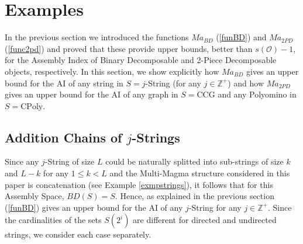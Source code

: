 \documentclass[letterpaper,12pt]{article}
\theoremstyle{definition}
\begin{document}





\section{Examples}\label{secExa}
In the previous section we introduced the functions $Ma_{BD}$ (\ref{funBD}) and $Ma_{2PD}$ (\ref{func2pd}) and proved that these provide upper bounds, better than $s(\mathscr{O})-1$, for the Assembly Index of Binary Decomposable and 2-Piece Decomposable objects, respectively. In this section, we show explicitly how $Ma_{BD}$ gives an upper bound for the AI of any string in $S=j$-String (for any $j \in \mathbb{Z}^+$) and how $Ma_{2PD}$ gives an upper bound for the AI of any graph in $S=\text{CCG}$ and any Polyomino in $S=\text{CPoly}$.             

\subsection{Addition Chains of $j$-Strings}
Since any $j$-String of size $L$ could be naturally splitted into sub-strings of size $k$ and $L-k$ for any $1 \leq k<L$ and the Multi-Magma structure considered in this paper is concatenation (see Example \ref{exmpstrings}), it follows that for this Assembly Space, $BD(S)=S$.  Hence, as explained in the previous section (\ref{funBD}) gives an upper bound for the AI of any $j$-String for any $j \in \mathbb{Z}^+$. Since the cardinalities of the sets $S(2^i)$ are different for directed and undirected strings, we consider each case separately.      
\end{document}
